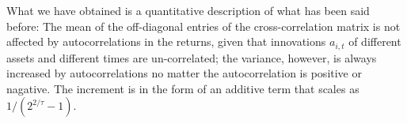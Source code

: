 \documentclass{book}
\begin{document}
What we have obtained is a quantitative description of what has been
said before: The mean of the off-diagonal entries of the
cross-correlation matrix is not affected by autocorrelations in the
returns, given that innovations $a_{i,t}$ of different assets and
different times are un-correlated; the variance, however, is always
increased by autocorrelations no matter the autocorrelation is
positive or nagative. The increment is in the form of an additive term
that scales as $1 / (2^{2/\tau} - 1)$.



\end{document}
